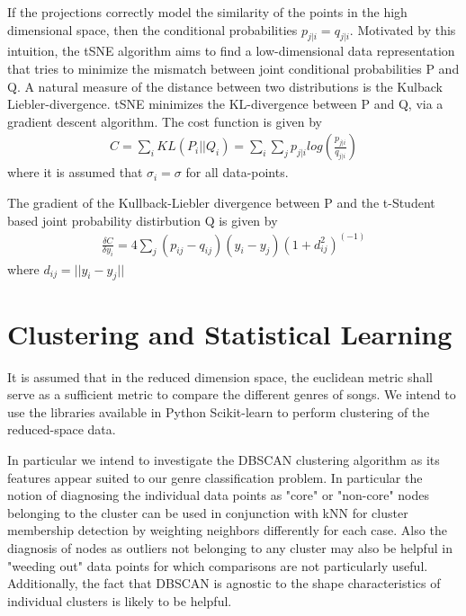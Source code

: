 \documentclass[12pt]{article}
\begin{document}
If the projections correctly model the similarity of the points in the high dimensional space, then the conditional probabilities $p_{j|i} = q_{j|i}$. Motivated by this intuition, the tSNE algorithm aims to find a low-dimensional data representation that tries to minimize the mismatch between joint conditional probabilities P and Q.	A natural measure of the distance between two distributions is the Kulback Liebler-divergence. tSNE minimizes the KL-divergence between P and Q, via a gradient descent algorithm. The cost function is given by
\begin{align}
C = \sum_i KL(P_i || Q_i) = \sum_i \sum_j p_{j|i} log(\frac{p_{j|i}}{q_{j|i}})\label{eq:Cost_tSNE}
\end{align}
where it is assumed that $\sigma_i = \sigma$ for all data-points. 

The gradient of the Kullback-Liebler divergence between P and the t-Student based joint probability distirbution Q is given by
\begin{align}
\frac{\delta C}{\delta y_i} =  4 \sum_j (p_{ij} - q_{ij})(y_i - y_j)(1 + d_{ij}^2)^(-1)\label{eq:Grad_KL_tsne}
\end{align} where $d_{ij} = ||y_i - y_j||$

\section{Clustering and Statistical Learning}
It is assumed that in the reduced dimension space, the euclidean metric shall serve as a sufficient metric to compare the different genres of songs. We intend to use the libraries available in Python Scikit-learn \cite{scikitlearn} to perform clustering of the reduced-space data.

In particular we intend to investigate the DBSCAN clustering algorithm as its features appear suited to our genre classification problem.  In particular the notion of diagnosing the individual data points as "core" or "non-core" nodes belonging to the cluster can be used in conjunction with kNN for cluster membership detection by weighting neighbors differently for each case.  Also the diagnosis of nodes as outliers not belonging to any cluster may also be helpful in "weeding out" data points for which comparisons are not particularly useful.  Additionally, the fact that DBSCAN is agnostic to the shape characteristics of individual clusters is likely to be helpful.
\end{document}
